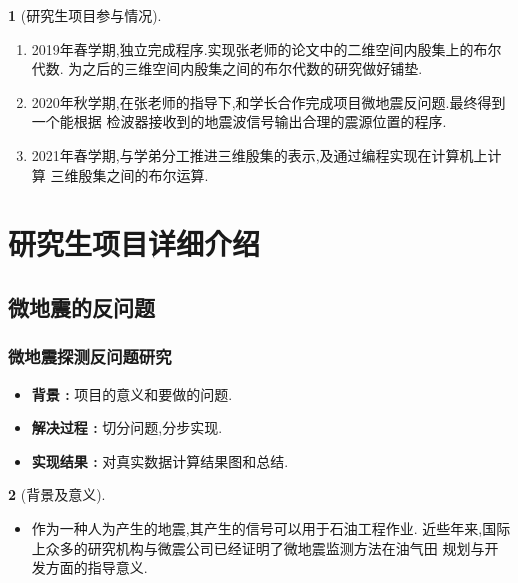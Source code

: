 \documentclass[UTF8]{ctexbeamer}	%
\theoremstyle{plain}
\theoremstyle{definition}
\newtheorem{emt}{}[section]
\theoremstyle{remark}
\numberwithin{equation}{section}
\begin{document}
\begin{frame}[fragile]
   \begin{emt} [研究生项目参与情况]
    \begin{enumerate}
        \item 2019年春学期,独立完成程序.实现张老师的论文中的二维空间内殷集上的布尔代数.
        为之后的三维空间内殷集之间的布尔代数的研究做好铺垫.
        \item 2020年秋学期,在张老师的指导下,和学长合作完成项目微地震反问题.最终得到一个能根据
        检波器接收到的地震波信号输出合理的震源位置的程序.
        \item 2021年春学期,与学弟分工推进三维殷集的表示,及通过编程实现在计算机上计算
        三维殷集之间的布尔运算.
    \end{enumerate}
   \end{emt}
\end{frame}

\section{研究生项目详细介绍}
\subsection{微地震的反问题}

\begin{frame}
    \frametitle{微地震探测反问题研究}
    \begin{itemize}
        \setlength{\itemsep}{30pt}
        \item \textbf{背景 : } 项目的意义和要做的问题.
        \item  \textbf{解决过程 : } 切分问题,分步实现.
        \item \textbf{实现结果 : } 对真实数据计算结果图和总结.
    \end{itemize}
\end{frame}

\begin{frame}
    \begin{emt}[背景及意义]
      
    \begin{itemize}
\item 作为一种人为产生的地震,其产生的信号可以用于石油工程作业.
近些年来,国际上众多的研究机构与微震公司已经证明了微地震监测方法在油气田
规划与开发方面的指导意义.

    \end{itemize}

    
\end{emt}
\end{frame}


\end{document}
